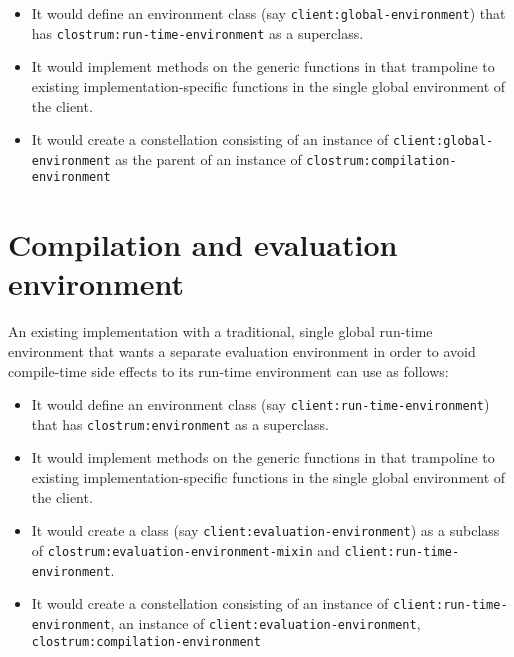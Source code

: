\begin{itemize}
\item It would define an environment class  (say
  \texttt{client:global-environment}) that has
  \texttt{clostrum:run-time-environment} as a superclass.
\item It would implement methods on the generic functions in
   that trampoline to existing
  implementation-specific functions in the single global environment
  of the client.
\item It would create a constellation consisting of an instance of
  \texttt{client:global-environment} as the parent of an instance of
  \texttt{clostrum:compilation-environment}
\end{itemize}

\section{Compilation and evaluation environment}

An existing \commonlisp{} implementation with a traditional, single
global run-time environment that wants a separate evaluation
environment in order to avoid compile-time side effects to its
run-time environment can use \sysname{} as follows:

\begin{itemize}
\item It would define an environment class  (say
  \texttt{client:run-time-environment}) that has
  \texttt{clostrum:environment} as a superclass.
\item It would implement methods on the generic functions in
   that trampoline to existing
  implementation-specific functions in the single global environment
  of the client.
\item It would create a class (say
  \texttt{client:evaluation-environment}) as a subclass of
  \texttt{clostrum:evaluation-environment-mixin} and
  \texttt{client:run-time-environment}.
\item It would create a constellation consisting of an instance of
  \texttt{client:run-time-environment}, an instance of
  \texttt{client:evaluation-environment},
  \texttt{clostrum:compilation-environment}
\end{itemize}

